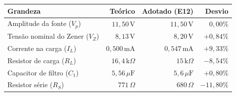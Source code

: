 \documentclass[11pt,a4paper]{article}
\begin{document}
\begin{center}
\renewcommand{\arraystretch}{1.2}
\begin{tabular}{@{}lrrr@{}}
\toprule
\textbf{Grandeza} &
\textbf{Teórico} &
\textbf{Adotado (E12)} &
\textbf{Desvio} \\
\midrule
Amplitude da fonte ($V_p$)
    & $11{,}50\,\text{V}$
    & $11{,}50\,\text{V}$
    & $0{,}00\%$ \\

Tensão nominal do Zener ($V_Z$)
    & $8{,}13\,\text{V}$
    & $8{,}20\,\text{V}$
    & $+0{,}84\%$ \\

Corrente na carga ($I_L$)
    & $0{,}500\,\text{mA}$
    & $0{,}547\,\text{mA}$
    & $+9{,}33\%$ \\

Resistor de carga ($R_L$)
    & $16{,}4\,\text{k}\Omega$
    & $15\,\text{k}\Omega$
    & $-8{,}54\%$ \\

Capacitor de filtro ($C_1$)
    & $5{,}56\,\mu\text{F}$
    & $5{,}6\,\mu\text{F}$
    & $+0{,}80\%$ \\

Resistor série ($R_S$)
    & $771\,\Omega$
    & $680\,\Omega$
    & $-11{,}80\%$ \\
\bottomrule
\end{tabular}
\end{center}
\end{document}
